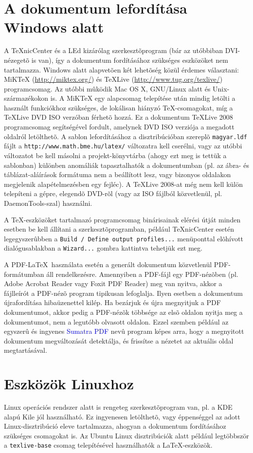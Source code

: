 \section{A dokumentum lefordítása Windows alatt}
A TeXnicCenter és a LEd kizárólag szerkesztõprogram (bár az utóbbiban DVI-nézegetõ is van), így a dokumentum fordításához szükséges eszközöket nem tartalmazza. Windows alatt alapvetõen két lehetõség közül érdemes választani: MiKTeX (\url{http://miktex.org/}) és TeXLive (\url{http://www.tug.org/texlive/}) programcsomag. Az utóbbi mûködik Mac OS X, GNU/Linux alatt és Unix-származékokon is. A MiKTeX egy alapcsomag telepítése után mindig letölti a használt funkciókhoz szükséges, de lokálisan hiányzó \TeX-csomagokat, míg a TeXLive DVD ISO verzóban férhetõ hozzá. Ez a dokumentum TeXLive 2008 programcsomag segítségével fordult, amelynek DVD ISO verziója a megadott oldalról letölthetõ. A sablon lefordításához a disztribúcióban szereplõ \verb+magyar.ldf+ fájlt a \verb+http://www.math.bme.hu/latex/+ változatra kell cserélni, vagy az utóbbi változatot be kell másolni a projekt-könyvtárba (ahogy ezt meg is tettük a sablonban) különben anomáliák tapasztalhatók a dokumentumban (pl. az ábra- és táblázat-aláírások formátuma nem a beállított lesz, vagy bizonyos oldalakon megjelenik alapételmezésben egy fejléc). A TeXLive 2008-at még nem kell külön telepíteni a gépre, elegendõ DVD-rõl (vagy az ISO fájlból közvetlenül, pl. DaemonTools-szal) használni. 

A \TeX-eszközöket tartalmazó programcsomag binárisainak elérési útját minden esetben be kell állítani a szerkesztõprogramban, például TeXnicCenter esetén legegyszerûbben a \verb+Build / Define output profiles...+ menüponttal elõhívott dialógusablakban a \verb+Wizard...+ gombra kattintva tehetjük ezt meg.

A PDF-\LaTeX~használata esetén a generált dokumentum közvetlenül PDF-formátumban áll rendelkezésre. Amennyiben a PDF-fájl egy PDF-nézõben (pl. Adobe Acrobat Reader vagy Foxit PDF Reader) meg van nyitva, akkor a fájlleírót a PDF-nézõ program tipikusan lefoglalja. Ilyen esetben a dokumentum újrafordítása hibaüzenettel kilép. Ha bezárjuk és újra megnyitjuk a PDF dokumentumot, akkor pedig a PDF-nézõk többsége az elsõ oldalon nyitja meg a dokumentumot, nem a legutóbb olvasott oldalon. Ezzel szemben például az egyszerû és ingyenes \textcolor{blue}{Sumatra PDF} nevû program képes arra, hogy a megnyitott dokumentum megváltozását detektálja, és frissítse a nézetet az aktuális oldal megtartásával.

\section{Eszközök Linuxhoz}
Linux operációs rendszer alatt is rengeteg szerkesztõprogram van, pl. a KDE alapú Kile jól használható. Ez ingyenesen letölthetõ, vagy éppenséggel az adott Linux-disztribúció eleve tartalmazza, ahogyan a dokumentum fordításához szükséges csomagokat is. Az Ubuntu Linux disztribúciók alatt például legtöbbször a \verb+texlive-base+ csomag telepítésével használhatók a \LaTeX-eszközök.
